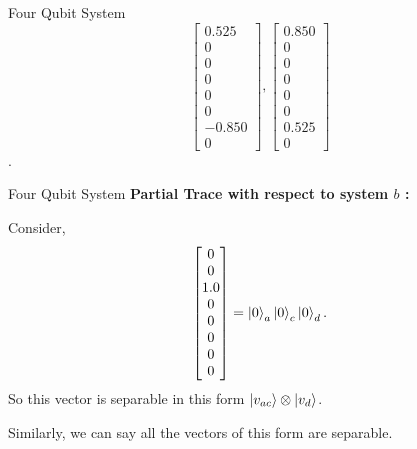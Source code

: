\documentclass{beamer}
\begin{document}
\begin{frame}{Four Qubit System}
{\begin{equation*}
		\left[\begin{matrix}0.525\\0\\0\\0\\0\\0\\-0.850\\0\end{matrix}\right],
		\left[\begin{matrix}0.850\\0\\0\\0\\0\\0\\0.525\\0\end{matrix}\right]
	\end{equation*}}
.
\end{frame}

\begin{frame}{Four Qubit System}
	\textbf{Partial Trace with respect to system $b$ :}
	
	Consider, 
	\begin{equation*}
		\left[\begin{matrix}0\\0\\1.0\\0\\0\\0\\0\\0\end{matrix}\right] = \ket{0}_a\ket{0}_c\ket{0}_d.
	\end{equation*}
So this vector is separable in this form $\ket{v_{ac}} \otimes \ket{v_d}$.

Similarly, we can say all the vectors of this form are separable.
\end{frame}
\end{document}
